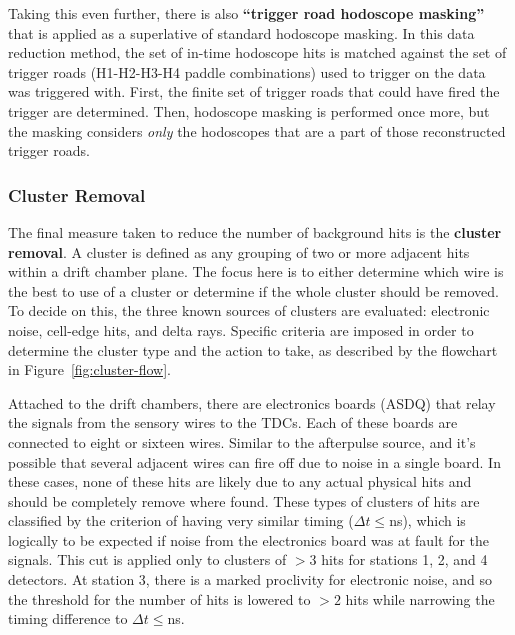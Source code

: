 Taking this even further, there is also \textbf{``trigger road hodoscope masking''} that is applied as a superlative of standard hodoscope masking. In this data reduction method, the set of in-time hodoscope hits is matched against the set of trigger roads (H1-H2-H3-H4 paddle combinations) used to trigger on the data was triggered with. First, the finite set of trigger roads that could have fired the trigger are determined. Then, hodoscope masking is performed once more, but the masking considers \emph{only} the hodoscopes that are a part of those reconstructed trigger roads.

\subsubsection{Cluster Removal}

The final measure taken to reduce the number of background hits is the \textbf{cluster removal}. A cluster is defined as any grouping of two or more adjacent hits within a drift chamber plane. The focus here is to either determine which wire is the best to use of a cluster or determine if the whole cluster should be removed. To decide on this, the three known sources of clusters are evaluated: electronic noise, cell-edge hits, and delta rays. Specific criteria are imposed in order to determine the cluster type and the action to take, as described by the flowchart in Figure~\ref{fig:cluster-flow}.

Attached to the drift chambers, there are electronics boards (ASDQ) that relay the signals from the sensory wires to the TDCs. Each of these boards are connected to eight or sixteen wires. Similar to the afterpulse source, and it's possible that several adjacent wires can fire off due to noise in a single board. In these cases, none of these hits are likely due to any actual physical hits and should be completely remove where found.  These types of clusters of hits are classified by the criterion of having very similar timing ($\Delta t \leq $\unit[10]{ns}), which is logically to be expected if noise from the electronics board was at fault for the signals. This cut is applied only to clusters of $>3$ hits for stations 1, 2, and 4 detectors. At station 3, there is a marked proclivity for electronic noise, and so the threshold for the number of hits is lowered to $>2$ hits while narrowing the timing difference to $\Delta t \leq$\unit[8]{ns}.

